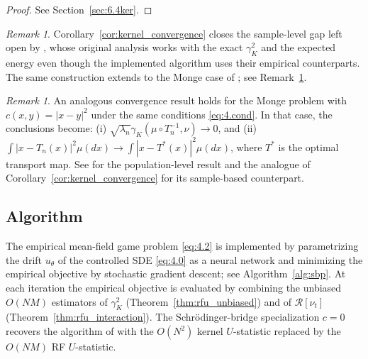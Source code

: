 \documentclass[11pt,leqno]{article}
\theoremstyle{plain}
\theoremstyle{remark}
\newtheorem{rem}[thm]{Remark}
\theoremstyle{definition}
\numberwithin{equation}{section}
\numberwithin{figure}{section}
\numberwithin{table}{section}
\numberwithin{algorithm}{section}
\begin{document}
\begin{proof}
See Section~\ref{sec:6.4ker}.
\end{proof}

\begin{rem}\label{rem:cor_nak}
Corollary~\ref{cor:kernel_convergence} closes the sample-level gap left open by \cite{nak:2024sb},
whose original analysis works with the exact $\gamma_K^2$ and the expected energy
even though the implemented algorithm uses their empirical counterparts.
The same construction extends to the Monge case of \cite{sai-nak:2025};
see Remark~\ref{rem:4.1}.
\end{rem}

\begin{rem}\label{rem:4.1}
An analogous convergence result holds for the Monge problem with $c(x,y)=|x-y|^2$
under the same conditions \eqref{eq:4.cond}.
In that case, the conclusions become:
(i) $\sqrt{\lambda_n}\gamma_K(\mu\circ T_n^{-1},\nu)\to 0$, and
(ii) $\int |x-T_n(x)|^2 \mu(dx) \to \int |x - T^*(x)|^2 \mu(dx)$,
where $T^*$ is the optimal transport map.
See \cite[Theorem~2.1]{sai-nak:2025} for the population-level result and
the analogue of Corollary~\ref{cor:kernel_convergence} for its sample-based counterpart.
\end{rem}


\subsection{Algorithm}\label{sec:4.3alg}

The empirical mean-field game problem \eqref{eq:4.2} is implemented by
parametrizing the drift $u_\theta$ of the controlled SDE \eqref{eq:4.0} as a neural network
and minimizing the empirical objective by stochastic gradient descent;
see Algorithm~\ref{alg:sbp}.
At each iteration the empirical objective is evaluated by combining
the unbiased $O(NM)$ estimators of $\gamma_K^2$ (Theorem~\ref{thm:rfu_unbiased})
and of $\mathcal{R}[\nu_t]$ (Theorem~\ref{thm:rfu_interaction}).
The Schr{\"o}dinger-bridge specialization $c=0$ recovers the algorithm of \cite{nak:2024sb}
with the $O(N^2)$ kernel $U$-statistic replaced by the $O(NM)$ RF $U$-statistic.
\end{document}
